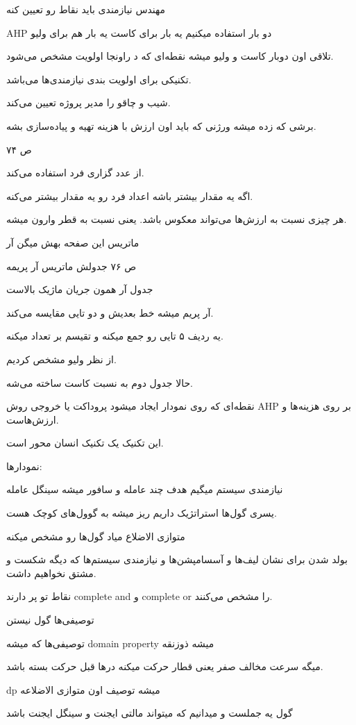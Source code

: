 مهندس نیازمندی باید نقاط رو تعیین کنه

AHP
دو بار استفاده میکنیم یه بار برای کاست یه بار هم برای ولیو

تلاقی اون دوبار کاست و ولیو میشه نقطه‌ای که د راونجا اولویت مشخص می‌شود.

تکنیکی برای اولویت بندی نیازمندی‌ها می‌باشد.

شیب و چاقو را مدیر پروژه تعیین می‌کند.

برشی که زده میشه ورژنی که باید اون ارزش با هزینه تهیه و پیاده‌سازی بشه.

ص ۷۴

از عدد گزاری فرد استفاده می‌کند.

اگه یه مقدار بیشتر باشه اعداد فرد رو یه مقدار بیشتر می‌کنه.

هر چیزی نسبت به ارزش‌ها می‌تواند معکوس باشد. یعنی نسبت به قطر وارون میشه.

ماتریس این صفحه بهش میگن آر

ص ۷۶ جدولش ماتریس آر پریمه

جدول آر همون جریان ماژیک بالاست

آر پریم میشه خط بعدیش و دو تایی مقایسه می‌کند.

یه ردیف ۵ تایی رو جمع میکنه و تقیسم بر تعداد میکنه.

از نظر ولیو مشخص کردیم.

حالا جدول دوم به نسبت کاست ساخته می‌شه.

نقطه‌ای که روی نمودار ایجاد میشود پروداکت یا خروجی روش AHP بر روی هزینه‌ها و
ارزش‌هاست.

این تکنیک یک تکنیک انسان محور است.

نمودار‌ها:

نیازمندی سیستم میگیم هدف چند عامله
و سافور میشه سینگل عامله

یسری گول‌ها استراتژیک داریم ریز میشه به گوول‌های کوچک هست.

متوازی الاضلاع میاد گول‌ها رو مشخص میکنه

بولد شدن برای نشان لیف‌ها و آسسامپشن‌ها و نیازمندی سیستم‌ها که دیگه شکست و مشتق
نخواهیم داشت.

نقاط تو پر دارند complete and و complete or را مشخص می‌کنند.

توصیفی‌ها گول نیستن

توصیفی‌ها که میشه domain property میشه ذوزنقه

میگه سرعت مخالف صفر یعنی قطار حرکت میکنه در‌ها قبل حرکت بسته باشد.

dp میشه توصیف اون متوازی الاضلاعه

گول یه جملست و میدانیم که میتواند مالتی ایجنت و سینگل ایجنت باشد

